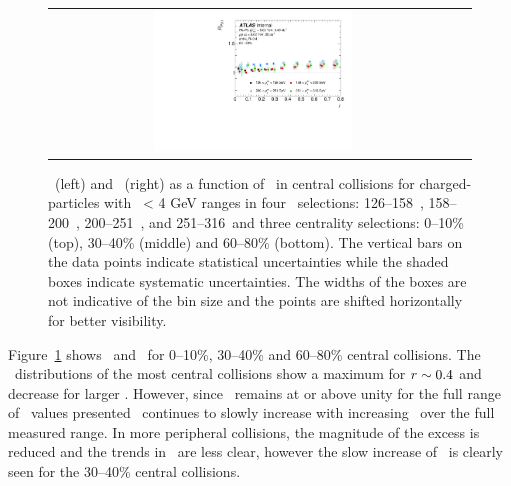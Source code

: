 \begin{figure}
{\begin{tabular}{cc}
	 \includegraphics[width=0.5\textwidth]{figures/main/results/RDpT_jetshape_cent5.pdf} \\
\end{tabular} }
   \caption{\RTheta\ (left) and \RP\ (right) as a function of \rvar\ in central collisions for charged-particles with \pt\ < 4 GeV ranges in four \ptjet\ selections: 126--158~\GeV, 158--200~\GeV, 200--251~\GeV, and 251--316~\GeV and three centrality selections: 0--10\% (top), 30--40\% (middle) and 60--80\% (bottom). The vertical bars on the data points indicate statistical uncertainties while the shaded boxes indicate systematic uncertainties. The widths of the boxes are not indicative of the bin size and the points are shifted horizontally for better visibility. }
      \label{fig:RPRT}
\end{figure}


Figure~\ref{fig:RPRT} shows \RTheta\ and \RP\ for 0--10\%, 30--40\% and 60--80\% central collisions.  The \RTheta\ 
distributions of the most central collisions show a maximum for $\mbox{$r$} \sim 0.4$ and decrease for larger \rvar.
However, since \RTheta\ remains at or above unity for the full range of \rvar\ values presented \RP\ continues
to slowly increase with increasing \rvar\ over the full measured range.  In more peripheral collisions,
the magnitude of the excess is reduced and the trends in \RTheta\ are less clear, however the slow increase
of \RP\ is clearly seen for the 30--40\% central collisions.




\FloatBarrier
